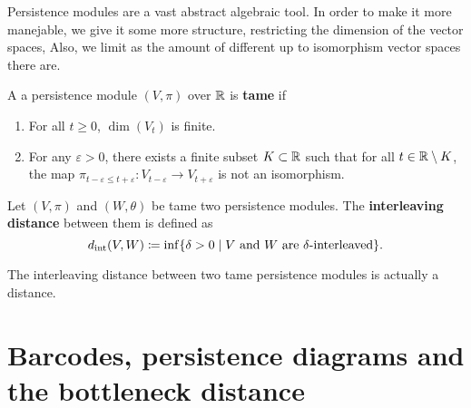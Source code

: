 Persistence modules are a vast abstract algebraic tool. In order to make it more manejable, we give it some more structure, restricting the dimension of the vector spaces, Also, we limit as the amount of different up to isomorphism vector spaces there are.

\begin{definition}
    A a persistence module $ (V, \pi) $ over $ \mathbb R $ is {\bf tame} if
    \begin{enumerate}
        \renewcommand{\labelenumi}{(\roman{enumi})}
        \item For all $ t \geq 0 $, $ \dim(V_t) $ is finite.
        \item For any $\varepsilon > 0 $, there exists a finite subset $ K \subset \mathbb R $ such that for all $ t \in \mathbb R \setminus K $, the map $ \pi_{t-\varepsilon \leq t+\varepsilon} \colon V_{t-\varepsilon} \to V_{t+\varepsilon} $ is not an isomorphism.
    \end{enumerate}
\end{definition}

\begin{definition}
    Let $ (V, \pi) $ and $ (W, \theta) $ be tame two persistence modules. The {\bf interleaving distance} between them is defined as
    $$
        d_{\operatorname{int}}(V, W) \coloneq \inf \{ \delta > 0 \mid V \text{ and } W \text{ are } \delta\text{-interleaved}\}.
    $$
\end{definition}

\begin{proposition}
    The interleaving distance between two tame persistence modules is actually a distance.
\end{proposition}

\begin{definition}
    
\end{definition}

\begin{definition}
    
\end{definition}

\section{Barcodes, persistence diagrams and the bottleneck distance}

\begin{definition}[Barcode]

\end{definition}

